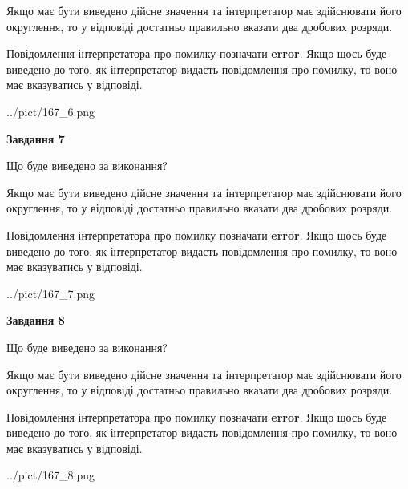 \documentclass[12pt, ukrainian]{article}
\begin{document}
{\begin {Large}
Якщо має бути виведено дійсне значення та інтерпретатор має здійснювати його округлення, 
то у відповіді достатньо правильно вказати два дробових розряди.

Повідомлення інтерпретатора про помилку позначати \textbf{error}.
Якщо щось буде виведено до того, як інтерпретатор видасть повідомлення про помилку, 
то воно має вказуватись у відповіді. \par

\begin{center}
	{../pict/167_6.png}
\end{center}
\newpage

{\begin {center}\textbf{Завдання 7}\end {center}}\par
Що буде виведено за виконання? \par

Якщо має бути виведено дійсне значення та інтерпретатор має здійснювати його округлення, 
то у відповіді достатньо правильно вказати два дробових розряди.

Повідомлення інтерпретатора про помилку позначати \textbf{error}.
Якщо щось буде виведено до того, як інтерпретатор видасть повідомлення про помилку, 
то воно має вказуватись у відповіді. \par

\begin{center}
	{../pict/167_7.png}
\end{center}
\newpage

{\begin {center}\textbf{Завдання 8}\end {center}}\par
Що буде виведено за виконання? \par

Якщо має бути виведено дійсне значення та інтерпретатор має здійснювати його округлення, 
то у відповіді достатньо правильно вказати два дробових розряди.

Повідомлення інтерпретатора про помилку позначати \textbf{error}.
Якщо щось буде виведено до того, як інтерпретатор видасть повідомлення про помилку, 
то воно має вказуватись у відповіді. \par

\begin{center}
	{../pict/167_8.png}
\end{center}
\newpage


\end{Large}}
\end{document}
